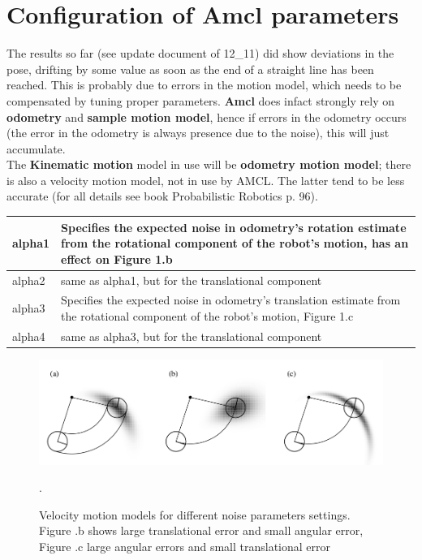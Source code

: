 \documentclass[11pt,a4paper]{article}
\begin{document}

%
%




\section{Configuration of Amcl parameters}

The results so far (see update document of 12{\_}11) did show deviations in the pose, drifting by some value as soon as the end of a straight line has been reached. This is probably due to errors in the motion model, which needs to be compensated by tuning proper parameters. \textbf{Amcl} does infact strongly rely on \textbf{odometry} and \textbf{sample motion model}, hence if errors in the odometry occurs (the error in the odometry is always presence due to the noise), this will just accumulate. \\
The \textbf{Kinematic motion} model in use will be \textbf{odometry motion model}; there is also a velocity motion model, not in use by AMCL. The latter tend to be less accurate (for all details see book Probabilistic Robotics p. 96).

\begin{center}
\begin{tabular}{| m{12em} | m{13em}|} 
\hline
alpha1 & Specifies the expected noise in odometry's rotation estimate from the rotational component of the robot's motion, has an effect on Figure 1.b\\
\hline
alpha2 & same as alpha1, but for the translational component\\
\hline
alpha3 & Specifies the expected noise in odometry's translation estimate from the rotational component of the robot's motion, Figure 1.c \\
\hline
alpha4 & same as alpha3, but for the translational component\\
\hline
\end{tabular}
\end{center}

\begin{figure}[H]
	\center
	\includegraphics[width=.7\textwidth]{figures/motion_models.png}
	\caption{Velocity motion models for different noise parameters settings. Figure .b shows large translational error and small angular error, Figure .c large angular errors and small translational error}.
	\label{fig:models}
\end{figure}
\end{document}
